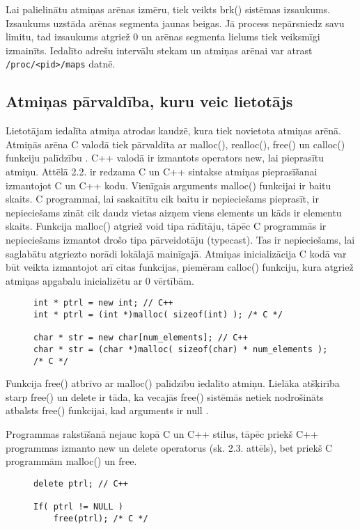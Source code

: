  Lai palielinātu atmiņas arēnas izmēru, tiek veikts brk() sistēmas izsaukums. Izsaukums uzstāda arēnas segmenta jaunas beigas. 
 Jā process nepārsniedz savu limitu, tad izsaukums atgriež 0 un arēnas segmenta lielums tiek veiksmīgi izmainīts.
 Iedalīto adrešu intervālu stekam un atmiņas arēnai var atrast \texttt{/proc/<pid>/maps} datnē.
\subsection{Atmiņas pārvaldība, kuru veic lietotājs}
Lietotājam iedalīta atmiņa atrodas kaudzē, kura tiek novietota atmiņas arēnā. 
Atmiņās arēna C valodā tiek pārvaldīta ar malloc(), realloc(), free() un calloc() funkciju palīdzību \cite {atparv}.
C++ valodā ir izmantots operators new, lai pieprasītu atmiņu.   
Attēlā 2.2. ir redzama C un C++ sintakse atmiņas pieprasīšanai izmantojot C un C++ kodu.
Vienīgais arguments malloc() funkcijai ir baitu skaits.
C programmai, lai saskaitītu cik baitu ir nepieciešams pieprasīt, ir nepieciešams zināt cik daudz vietas aizņem viens elements un kāds ir elementu skaits.
Funkcija malloc() atgriež void tipa rādītāju, tāpēc C programmās ir nepieciešams izmantot drošo tipa pārveidotāju (typecast). 
Tas ir nepieciešams, lai saglabātu atgriezto norādi lokālajā mainīgajā. Atmiņas inicializācija C kodā
var būt veikta izmantojot arī citas funkcijas, piemēram calloc() funkciju, kura atgriež atmiņas apgabalu inicializētu ar 0 vērtībām.

\begin{figure}[h]
\begin{lstlisting}
int * ptrl = new int; // C++
int * ptrl = (int *)malloc( sizeof(int) ); /* C */

char * str = new char[num_elements]; // C++
char * str = (char *)malloc( sizeof(char) * num_elements ); /* C */
\end{lstlisting}
\caption{\textbf{\fontsize{11}{12}\selectfont {Dinamiskās atmiņas iedalīšana C un C++}}}
\end{figure}


Funkcija free() atbrīvo ar malloc() palīdzību iedalīto atmiņu.
Lielāka atšķirība starp free() un delete ir tāda, ka vecajās free() sistēmās netiek nodrošināts atbalsts free() funkcijai, kad arguments ir null \cite{POCF}. 

Programmas rakstīšanā nejauc kopā C un C++ stilus, tāpēc priekš C++ programmas izmanto 
new un delete operatorus (sk. 2.3. attēls), bet priekš C programmām malloc() un free.


\begin{figure}[h]
\begin{lstlisting}
delete ptrl; // C++

If( ptrl != NULL )
	free(ptrl); /* C */
\end{lstlisting}
\caption{\textbf{\fontsize{11}{12}\selectfont {Dinamiskās atmiņas atbrīvošana C un C++}}}
\end{figure}


